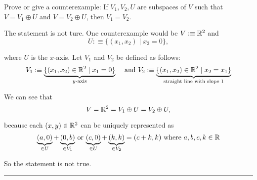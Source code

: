 \setcounter{xrcscount}{22}
\begin{xrcs}
  Prove or give a counterexample: If $V_1, V_2, U$ are subspaces of $V$ such that $V=V_1 \oplus U$ and $V=V_2 \oplus U$, then $V_1 = V_2$.

  \begin{xsol}
    The statement is not ture. One counterexample would be $V :\equiv \mathbb{R}^2$ and
    \begin{equation}
      U :\equiv \{ (x_1, x_2) \mid x_2=0 \},
    \end{equation}

    where $U$ is the $x$-axis. Let $V_1$ and $V_2$ be defined as follows:
    \[
      V_1 :\equiv \underbrace{\{(x_1, x_2) \in \real^2 \mid x_1 = 0 \}}_{\text{$y$-axis}} \quad $ and $
      V_2 :\equiv \underbrace{\{ (x_1, x_2) \in \real^2 \mid x_2 = x_1 \}}_{\text{straight line with slope $1$}}
    \]

    We can see that
    \begin{equation}
      V=\mathbb{R}^2=V_1 \oplus U = V_2 \oplus U,
    \end{equation}

    because each $(x,y)\in \mathbb{R}^2$ can be uniquely represented as \begin{equation}
      \underbrace{(a,0)}_{\in U}+\underbrace{(0,b)}_{\in V_1}$ or $\underbrace{(c,0)}_{\in U}+\underbrace{(k,k)}_{\in V_2}=(c+k,k)$ where $a,b,c,k \in \real
    \end{equation}

    So the statement is not true.
  \end{xsol}
\end{xrcs}

\phantom{.}

\hrule

\clearpage
